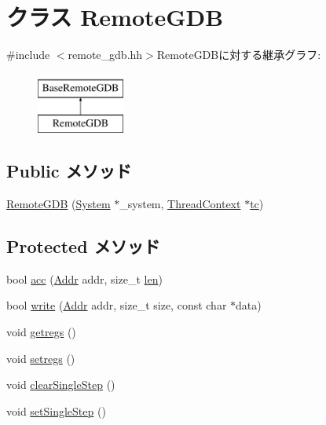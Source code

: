 \hypertarget{classArmISA_1_1RemoteGDB}{
\section{クラス RemoteGDB}
\label{classArmISA_1_1RemoteGDB}
}


{\ttfamily \#include $<$remote\_\-gdb.hh$>$}RemoteGDBに対する継承グラフ:\begin{figure}[H]
\begin{center}
\leavevmode
\includegraphics[height=2cm]{classArmISA_1_1RemoteGDB}
\end{center}
\end{figure}
\subsection*{Public メソッド}
\begin{DoxyCompactItemize}
\item 
\hyperlink{classArmISA_1_1RemoteGDB_a378793e7a68420568b51f355b7e8c473}{RemoteGDB} (\hyperlink{classSystem}{System} $\ast$\_\-system, \hyperlink{classThreadContext}{ThreadContext} $\ast$\hyperlink{namespaceArmISA_a5aff829af55e65b802d83dfcef4e9dd0}{tc})
\end{DoxyCompactItemize}
\subsection*{Protected メソッド}
\begin{DoxyCompactItemize}
\item 
bool \hyperlink{classArmISA_1_1RemoteGDB_ac4c7be164f087f2f53d137d9768809a7}{acc} (\hyperlink{classm5_1_1params_1_1Addr}{Addr} addr, size\_\-t \hyperlink{namespaceArmISA_a41a9f22a6c7645fac2f8d633371e354d}{len})
\item 
bool \hyperlink{classArmISA_1_1RemoteGDB_afbada55bb9d0e9c8c26bb48cb5890111}{write} (\hyperlink{classm5_1_1params_1_1Addr}{Addr} addr, size\_\-t size, const char $\ast$data)
\item 
void \hyperlink{classArmISA_1_1RemoteGDB_a62bc8adc5a48f1cbb5eb9bb64301d38d}{getregs} ()
\item 
void \hyperlink{classArmISA_1_1RemoteGDB_a2051121b6bc93c8ca3856bbeeca7bdc1}{setregs} ()
\item 
void \hyperlink{classArmISA_1_1RemoteGDB_afd89268069d9026378b06b08c97f65f8}{clearSingleStep} ()
\item 
void \hyperlink{classArmISA_1_1RemoteGDB_a40d5da340fdb741de8cd3ffbc69708fe}{setSingleStep} ()
\end{DoxyCompactItemize}
